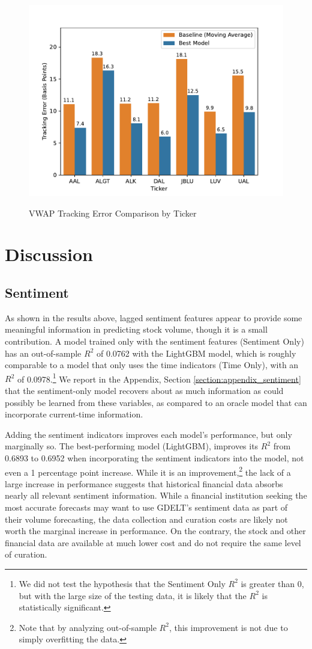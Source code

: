 \documentclass[12pt]{article}
\begin{document}
\begin{figure}[H]
    \centering
    \caption{VWAP Tracking Error Comparison by Ticker}
    \includegraphics[width=0.85\linewidth]{../Output/vwap_compare.pdf}
    \label{fig:vwap_tracking_error}
\end{figure}

\newpage
\section{Discussion}
\label{section:discussion}
\subsection{Sentiment}
As shown in the results above, lagged sentiment features appear to provide some meaningful information in predicting stock volume, though it is a small contribution. A model trained only with the sentiment features (Sentiment Only) has an out-of-sample $R^2$ of 0.0762 with the LightGBM model, which is roughly comparable to a model that only uses the time indicators (Time Only), with an $R^2$ of 0.0978.\footnote{We did not test the hypothesis that the Sentiment Only $R^2$ is greater than 0, but with the large size of the testing data, it is likely that the $R^2$ is statistically significant.} We report in the Appendix, Section \ref{section:appendix_sentiment} that the sentiment-only model recovers about as much information as could possibly be learned from these variables, as compared to an oracle model that can incorporate current-time information.

Adding the sentiment indicators improves each model's performance, but only marginally so. The best-performing model (LightGBM), improves its $R^2$ from 0.6893 to 0.6952 when incorporating the sentiment indicators into the model, not even a 1 percentage point increase. While it is an improvement,\footnote{Note that by analyzing out-of-sample $R^2$, this improvement is not due to simply overfitting the data.} the lack of a large increase in performance suggests that historical financial data absorbs nearly all relevant sentiment information. While a financial institution seeking the most accurate forecasts may want to use GDELT's sentiment data as part of their volume forecasting, the data collection and curation costs are likely not worth the marginal increase in performance. On the contrary, the stock and other financial data are available at much lower cost and do not require the same level of curation.
\end{document}
